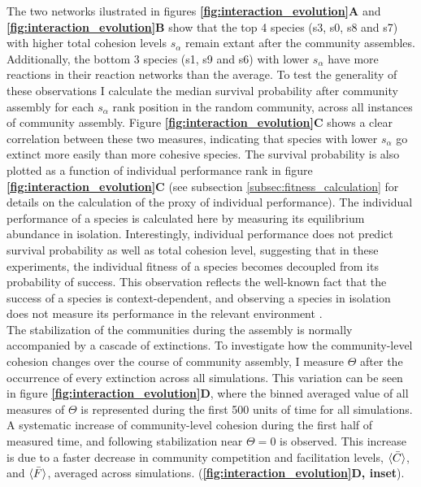 \documentclass[titlepage,11pt]{article}
\begin{document}
\begin{linenumbers}
\begin{singlespace}
			The two networks ilustrated in figures \textbf{\ref{fig:interaction_evolution}A} and \textbf{\ref{fig:interaction_evolution}B} show that the top 4 species (s3, s0, s8 and s7) with higher total cohesion levels $ s_{\alpha} $ remain extant after the community assembles. Additionally, the bottom 3 species (s1, s9 and s6) with lower $ s_{\alpha} $ have more reactions in their reaction networks than the average. To test the generality of these observations I calculate the median survival probability after community assembly for each $ s_{\alpha} $ rank position in the random community, across all instances of community assembly. Figure \textbf{\ref{fig:interaction_evolution}C} shows a clear correlation between these two measures, indicating that species with lower $ s_{\alpha} $ go extinct more easily than more cohesive species. The survival probability is also plotted as a function of individual performance rank in figure \textbf{\ref{fig:interaction_evolution}C} (see subsection \ref{subsec:fitness_calculation} for details on the calculation of the proxy of individual performance). The individual performance of a species is calculated here by measuring its equilibrium abundance in isolation. Interestingly, individual performance does not predict survival probability as well as total cohesion level, suggesting that in these experiments, the individual fitness of a species becomes decoupled from its probability of success. This observation reflects the well-known fact that the success of a species is context-dependent, and observing a species in isolation does not measure its performance in the relevant environment \citep{Tikhonov2016, McGill2006, Mcintire2014}.\\ %
			The stabilization of the communities during the assembly is normally accompanied by a cascade of extinctions.
			To investigate how the community-level cohesion changes over the course of community assembly, I measure $ \Theta $ after the occurrence of every extinction across all simulations. This variation can be seen in figure \textbf{\ref{fig:interaction_evolution}D}, where the binned averaged value of all measures of $ \Theta $ is represented during the first 500 units of time for all simulations. A systematic increase of community-level cohesion during the first half of measured time, and following stabilization near $ \Theta = 0 $ is observed. This increase is due to a faster decrease in community competition and facilitation levels, $ \braket{\bar{C}} $, and $ \braket{\bar{F}} $, averaged across simulations.  (\textbf{\ref{fig:interaction_evolution}D, inset}).\\

\end{singlespace}
\end{linenumbers}
\end{document}
